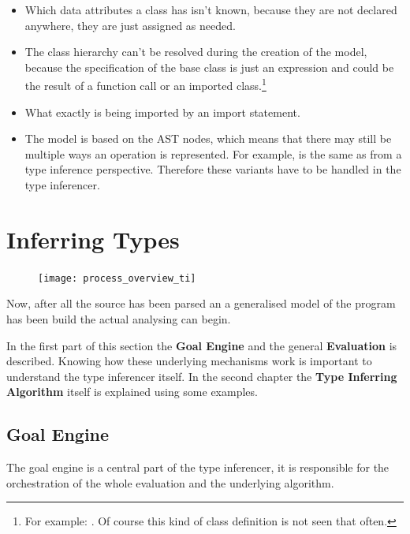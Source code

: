 \documentclass[12pt,halfparskip,DIV11,BCOR10mm]{scrreprt}
\begin{document}
\begin{itemize}
	\item Which data attributes a class has isn't known, because they are not declared anywhere, they are just assigned as needed.
	\item The class hierarchy can't be resolved during the creation of the model, because the specification of the base class is just an expression and could be the result of a function call or an imported class.\footnote{
	For example: . Of course this kind of class definition is not seen that often.}
	\item What exactly is being imported by an import statement.
	\item The model is based on the AST nodes, which means that there may still be multiple ways an operation is represented. For example,  is the same as  from a type inference perspective. Therefore these variants have to be handled in the type inferencer.
\end{itemize}


\section{Inferring Types}

\begin{figure}
		\vspace{-0.5cm}
    \texttt{[image: process\_overview\_ti]}
		\vspace{0cm}
\end{figure}

Now, after all the source has been parsed an a generalised model of the program has been build the actual analysing can begin. 

In the first part of this section the \textbf{Goal Engine} and the general \textbf{Evaluation} is described. Knowing how these underlying mechanisms work is important to understand the type inferencer itself. In the second chapter the \textbf{Type Inferring Algorithm} itself is explained using some examples. 

\subsection{Goal Engine}

The goal engine is a central part of the type inferencer, it is responsible for the orchestration of the whole evaluation and the underlying algorithm.
\end{document}
